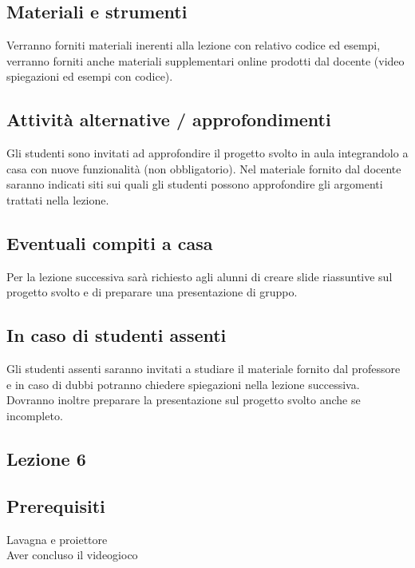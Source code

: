 \documentclass[12pt,a4paper]{article}
\begin{document}
\subsection*{Materiali e strumenti}

Verranno forniti materiali inerenti alla lezione con relativo codice ed esempi, verranno forniti anche materiali supplementari online prodotti dal docente (video spiegazioni ed esempi con codice).

\subsection*{Attività alternative / approfondimenti}

Gli studenti sono invitati ad approfondire il progetto svolto in aula integrandolo a casa con nuove funzionalità (non obbligatorio). Nel materiale fornito dal docente saranno indicati siti sui quali gli studenti possono approfondire gli argomenti trattati nella lezione. 

\subsection*{Eventuali compiti a casa}

Per la lezione successiva sarà richiesto agli alunni di creare slide riassuntive sul progetto svolto e di preparare una presentazione di gruppo. 

\subsection*{In caso di studenti assenti}
Gli studenti assenti saranno invitati a studiare il materiale fornito dal professore e in caso di dubbi potranno chiedere spiegazioni nella lezione successiva. Dovranno inoltre preparare la presentazione sul progetto svolto anche se incompleto.









\subsection{Lezione 6} 

\subsection*{Prerequisiti}
Lavagna e proiettore\\
Aver concluso il videogioco
\end{document}
